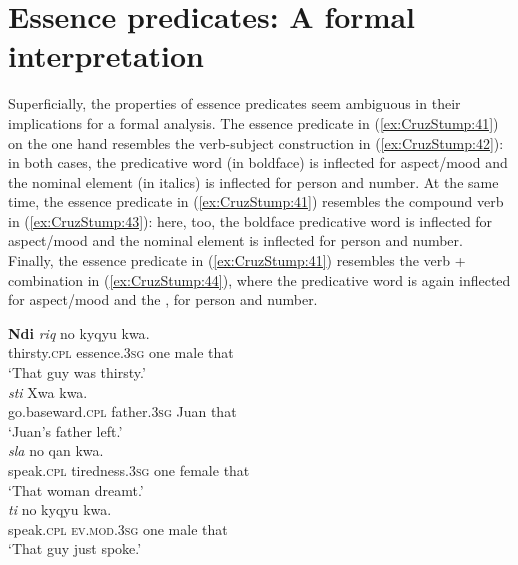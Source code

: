 \documentclass[output=paper]{langsci/langscibook}
\begin{document}
\section{Essence predicates:  A formal interpretation}


Superficially, the properties of essence predicates seem ambiguous in their implications for a formal analysis.  The essence predicate in (\ref{ex:CruzStump:41}) on the one hand resembles the verb-subject construction in (\ref{ex:CruzStump:42}):  in both cases, the predicative word (in boldface) is inflected for aspect/mood and the nominal element (in italics) is inflected for person and number.   At the same time, the essence predicate in (\ref{ex:CruzStump:41}) resembles the compound verb in (\ref{ex:CruzStump:43}):  here, too, the boldface predicative word is inflected for aspect/mood and the nominal element is inflected for person and number.  Finally, the essence predicate in (\ref{ex:CruzStump:41}) resembles the verb +  combination in (\ref{ex:CruzStump:44}), where the predicative word is again inflected for aspect/mood and the , for person and number.

\begin{exe}

	\ex\label{ex:CruzStump:41}
	\gll
	 {\textbf{{Ndi}}} {\textit{{riq}}} {{no}} {{kyqyu}} {{kwa}.}\\
	 {thirsty.\textsc{cpl}} {essence.\textsc{3sg}} {one} {male} {that}\\
	\glt `That guy was thirsty.'\\



	\ex\label{ex:CruzStump:42}
	 {\textit{{sti}}} {{Xwa}} {{kwa}.}\\
	 {go.baseward.\textsc{cpl}} {father.\textsc{3sg}} {Juan} {that}\\
	\glt `Juan's father left.'\\



	\ex\label{ex:CruzStump:43}
	 {\textit{{sla}}} {{no}} {{qan}} {{kwa}.}\\
	 {speak.\textsc{cpl}} {tiredness.\textsc{3sg}} {one} {female} {that}\\
	\glt `That woman dreamt.'\\



	\ex\label{ex:CruzStump:44}
	 {\textit{{ti}}} {{no}} {{kyqyu}} {{kwa}.}\\
	 {speak.\textsc{cpl}} {\textsc{ev.mod.3sg}} {one} {male} {that}\\
	\glt `That guy just spoke.'\\

\end{exe}
\end{document}
